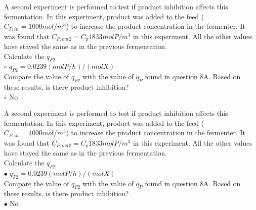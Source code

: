\documentclass[]{beamer}
\begin{document}
\begin{frame}[shrink] {}
A second experiment is performed to test if product inhibition affects this fermentation. In this experiment, product was added to the feed ($C_{P,in} = 1000 mol/m^3$) to increase the product concentration in the fermenter. It was found that $C_{P,out2} =C_p  1833 mol P/m^3$ in this experiment. All the other values have stayed the same as in the previous fermentation. \\[0.3em]
Calculate the $q_{P2}$ \\
{\color{red}$\circ$} $q_{P2}=0.0239(molP/h)/(molX)$ \\[0.5em]
Compare the value of $q_{P2}$ with the value of $q_{P}$ found in question 8A. Based on these results, is there product inhibition? \\
{\color{red}$\circ$} No \\
\end{frame}
\begin{frame}[shrink] {}
A second experiment is performed to test if product inhibition affects this fermentation. In this experiment, product was added to the feed ($C_{P,in} = 1000 mol/m^3$) to increase the product concentration in the fermenter. It was found that $C_{P,out2} =C_p  1833 mol P/m^3$ in this experiment. All the other values have stayed the same as in the previous fermentation. \\[0.3em]
Calculate the $q_{P2}$ \\
{\color{red}$\bullet$} $q_{P2}=0.0239(molP/h)/(molX)$ \\[0.5em]
Compare the value of $q_{P2}$ with the value of $q_{P}$ found in question 8A. Based on these results, is there product inhibition? \\
{\color{red}$\bullet$} No \\
\end{frame}

\end{document}
